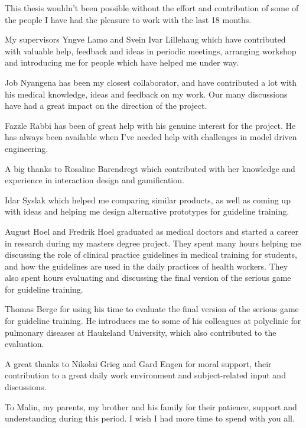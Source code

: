 This thesis wouldn't been possible without the effort and contribution of some of the people I have had the pleasure to work with the last 18 months.

My supervisors Yngve Lamo and Svein Ivar Lillehaug which have contributed with valuable help, feedback and ideas in periodic meetings, arranging workshop and introducing me for people which have helped me under way.
 
Job Nyangena has been my closest collaborator, and have contributed a lot with his medical knowledge, ideas and feedback on my work. Our many discussions have had a great impact on the direction of the project.

Fazzle Rabbi has been of great help with his genuine interest for the project. He has always been available when I've needed help with challenges in model driven engineering.

A big thanks to Rosaline Barendregt which contributed with her knowledge and experience in interaction design and gamification. 

Idar Syslak which helped me comparing similar products, as well as coming up with ideas and helping me design alternative prototypes for guideline training.

August Hoel and Fredrik Hoel graduated as medical doctors and started a career in research during my masters degree project. They spent many hours helping me discussing the role of clinical practice guidelines in medical training for students, and how the guidelines are used in the daily practices of health workers. They also spent hours evaluating and discussing the final version of the serious game for guideline training.

Thomas Berge for using his time to evaluate the final version of the serious game for guideline training. He introduces me to some of his colleagues at polyclinic for pulmonary diseases at Haukeland University, which also contributed to the evaluation.

A great thanks to Nikolai Grieg and Gard Engen for moral support, their contribution to a great daily work environment and subject-related input and discussions.

To Malin, my parents, my brother and his family for their patience, support and understanding during this period. I wish I had more time to spend with you all. 





 


 